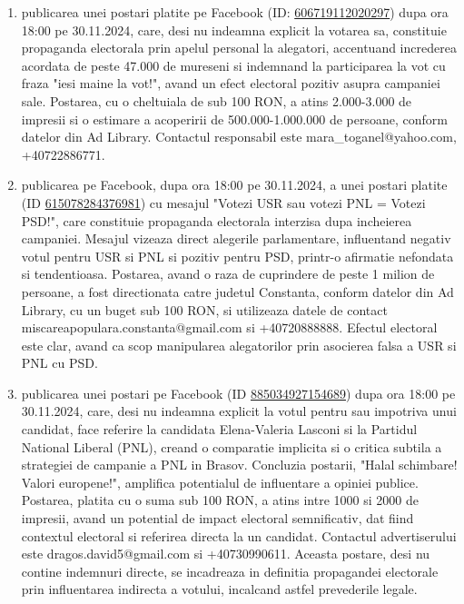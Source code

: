 \documentclass[a4paper,12pt]{article}
\begin{document}
\begin{enumerate}[leftmargin=*, label=\arabic*.)]
    \item publicarea unei postari platite pe Facebook (ID: \href{https://www.facebook.com/ads/library/?id=606719112020297}{606719112020297}) dupa ora 18:00 pe 30.11.2024, care, desi nu indeamna explicit la votarea sa, constituie propaganda electorala prin apelul personal la alegatori,  accentuand increderea acordata de peste 47.000 de mureseni si indemnand la participarea la vot cu fraza "iesi maine la vot!", avand un efect electoral pozitiv asupra campaniei sale. Postarea, cu o cheltuiala de sub 100 RON, a atins 2.000-3.000 de impresii si o estimare a acoperirii de 500.000-1.000.000 de persoane, conform datelor din Ad Library.  Contactul responsabil este mara\_toganel@yahoo.com, +40722886771.
    \item publicarea pe Facebook, dupa ora 18:00 pe 30.11.2024, a unei postari platite (ID \href{https://www.facebook.com/ads/library/?id=615078284376981}{615078284376981}) cu mesajul "Votezi USR sau votezi PNL = Votezi PSD!",  care constituie propaganda electorala interzisa dupa incheierea campaniei.  Mesajul vizeaza direct alegerile parlamentare, influentand negativ votul pentru USR si PNL si pozitiv pentru PSD, printr-o afirmatie nefondata si tendentioasa.  Postarea, avand o raza de cuprindere de peste 1 milion de persoane,  a fost directionata catre judetul Constanta, conform datelor din Ad Library, cu un buget sub 100 RON,  si utilizeaza datele de contact miscareapopulara.constanta@gmail.com si +40720888888.  Efectul electoral este clar, avand ca scop manipularea alegatorilor prin asocierea falsa a USR si PNL cu PSD.
    \item publicarea unei postari pe Facebook (ID \href{https://www.facebook.com/ads/library/?id=885034927154689}{885034927154689}) dupa ora 18:00 pe 30.11.2024, care, desi nu indeamna explicit la votul pentru sau impotriva unui candidat, face referire la candidata Elena-Valeria Lasconi si la Partidul National Liberal (PNL), creand o comparatie implicita si o critica subtila a strategiei de campanie a PNL in Brasov.  Concluzia postarii, "Halal schimbare! Valori europene!", amplifica potentialul de influentare a opiniei publice.  Postarea, platita cu o suma sub 100 RON, a atins intre 1000 si 2000 de impresii, avand un potential de impact electoral semnificativ, dat fiind contextul electoral si referirea directa la un candidat.  Contactul advertiserului este dragos.david5@gmail.com si +40730990611.  Aceasta postare, desi nu contine indemnuri directe, se incadreaza in definitia propagandei electorale prin influentarea indirecta a votului, incalcand astfel prevederile legale.

\end{enumerate}
\end{document}
